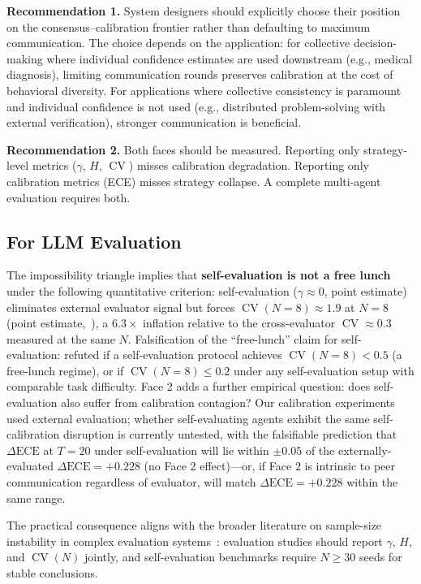 \documentclass[11pt]{article}
\DeclareMathOperator{\CV}{CV}
\begin{document}
\textbf{Recommendation 1.} System designers should explicitly choose their position on the consensus--calibration frontier rather than defaulting to maximum communication. The choice depends on the application: for collective decision-making where individual confidence estimates are used downstream (e.g., medical diagnosis), limiting communication rounds preserves calibration at the cost of behavioral diversity. For applications where collective consistency is paramount and individual confidence is not used (e.g., distributed problem-solving with external verification), stronger communication is beneficial.

\textbf{Recommendation 2.} Both faces should be measured. Reporting only strategy-level metrics ($\gamma$, $H$, $\CV$) misses calibration degradation. Reporting only calibration metrics (ECE) misses strategy collapse. A complete multi-agent evaluation requires both.

\subsection{For LLM Evaluation}

The impossibility triangle implies that \textbf{self-evaluation is not a free lunch} under the following quantitative criterion: self-evaluation ($\gamma \approx 0$, point estimate) eliminates external evaluator signal but forces $\CV(N{=}8) \approx 1.9$ at $N = 8$ (point estimate,~\cite{impossible2026}), a $6.3\times$ inflation relative to the cross-evaluator $\CV \approx 0.3$ measured at the same $N$. Falsification of the ``free-lunch'' claim for self-evaluation: refuted if a self-evaluation protocol achieves $\CV(N{=}8) < 0.5$ (a free-lunch regime), or if $\CV(N{=}8) \leq 0.2$ under any self-evaluation setup with comparable task difficulty. Face 2 adds a further empirical question: does self-evaluation also suffer from calibration contagion? Our calibration experiments used external evaluation; whether self-evaluating agents exhibit the same self-calibration disruption is currently untested, with the falsifiable prediction that $\Delta\text{ECE}$ at $T = 20$ under self-evaluation will lie within $\pm 0.05$ of the externally-evaluated $\Delta\text{ECE} = +0.228$ (no Face 2 effect)---or, if Face 2 is intrinsic to peer communication regardless of evaluator, will match $\Delta\text{ECE} = +0.228$ within the same range.

The practical consequence aligns with the broader literature on sample-size instability in complex evaluation systems~\cite{button2013power,ioannidis2005most}: evaluation studies should report $\gamma$, $H$, and $\CV(N)$ jointly, and self-evaluation benchmarks require $N \geq 30$ seeds for stable conclusions.
\end{document}
